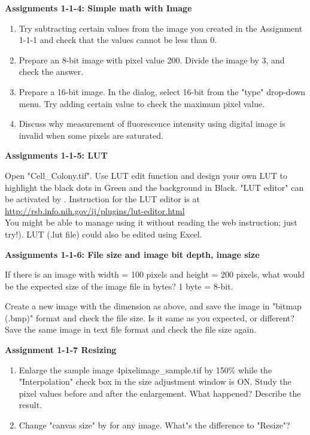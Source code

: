 \textbf{\sffamily
Assignments 1-1-4: Simple math with Image}
\begin{enumerate}
\item Try subtracting certain values from the image you created in
the Assignment 1-1-1 and check that the values cannot be less than 0. 
\item Prepare an 8-bit image with pixel value 200. Divide the
image by 3, and check the answer. 

\item Prepare a 16-bit image. In the  dialog, select 16-bit from the
"type" drop-down menu. Try adding
certain value to check the maximum pixel value. 

\item Discuss why measurement of fluorescence intensity using
digital image is invalid when some pixels are saturated. 
\end{enumerate}

\textbf{\sffamily
Assignments 1-1-5: LUT}

Open "Cell\_Colony.tif". Use LUT edit function and design your own LUT to highlight the black dots in
Green and the background in Black. "LUT editor" can be activated by . Instruction for the LUT editor is at\\
\url{http://rsb.info.nih.gov/ij/plugins/lut-editor.html} \\
You might be able to manage using it without reading the web instruction; just try!). LUT (.lut file) could also be edited using Excel. 

\textbf{\sffamily
Assignments 1-1-6: File size and image bit depth, image size}

If there is an image with width = 100 pixels and height = 200 pixels,
what would be the expected size of the image file in bytes? 1 byte =
8-bit.

Create a new image with the dimension as above, and save the image in
"bitmap (.bmp)" format and check the file
size. Is it same as you expected, or different? Save the same image in
text file format and check the file size again.

\textbf{\sffamily
Assignment 1-1-7 Resizing}

\begin{enumerate}
\item Enlarge the sample image 4pixelimage\_sample.tif by
150\% while the "Interpolation"
check box in the size adjustment window is ON. Study the pixel values
before and after the enlargement. What happened? Describe the result.

\item Change "canvas size" by  for any image. What"s the
difference to "Resize"?
\end{enumerate}


